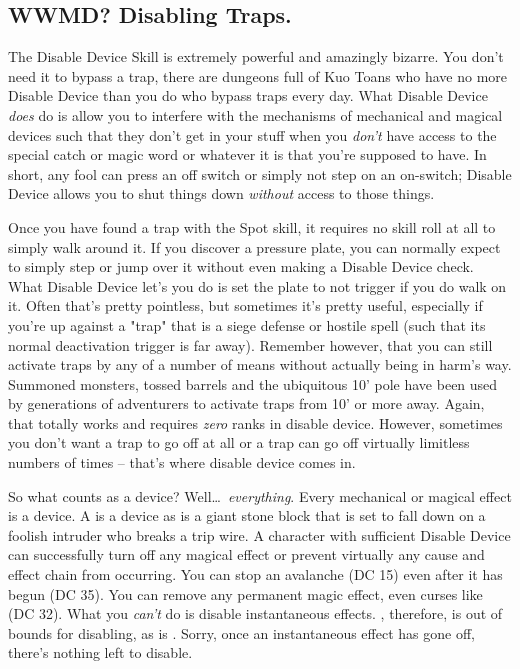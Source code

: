 \subsection{WWMD? Disabling Traps.}
\vspace*{-8pt}

The Disable Device Skill is extremely powerful and amazingly bizarre. You don't need it to bypass a trap, there are dungeons full of Kuo Toans who have no more Disable Device than you do who bypass traps every day. What Disable Device \textit{does} do is allow you to interfere with the mechanisms of mechanical and magical devices such that they don't get in your stuff when you \textit{don't} have access to the special catch or magic word or whatever it is that you're supposed to have. In short, any fool can press an off switch or simply not step on an on-switch; Disable Device allows you to shut things down \textit{without} access to those things.

Once you have found a trap with the Spot skill, it requires no skill roll at all to simply walk around it. If you discover a pressure plate, you can normally expect to simply step or jump over it without even making a Disable Device check. What Disable Device let's you do is set the plate to not trigger if you do walk on it. Often that's pretty pointless, but sometimes it's pretty useful, especially if you're up against a "trap" that is a siege defense or hostile spell (such that its normal deactivation trigger is far away). Remember however, that you can still activate traps by any of a number of means without actually being in harm's way. Summoned monsters, tossed barrels and the ubiquitous 10' pole have been used by generations of adventurers to activate traps from 10' or more away. Again, that totally works and requires \textit{zero} ranks in disable device. However, sometimes you don't want a trap to go off at all or a trap can go off virtually limitless numbers of times -- that's where disable device comes in.

So what counts as a device? Well\ldots\ \textit{everything}. Every mechanical or magical effect is a device. A  is a device as is a giant stone block that is set to fall down on a foolish intruder who breaks a trip wire. A character with sufficient Disable Device can successfully turn off any magical effect or prevent virtually any cause and effect chain from occurring. You can stop an avalanche (DC 15) even after it has begun (DC 35). You can remove any permanent magic effect, even curses like  (DC 32). What you \textit{can't} do is disable instantaneous effects. , therefore, is out of bounds for disabling, as is . Sorry, once an instantaneous effect has gone off, there's nothing left to disable.

